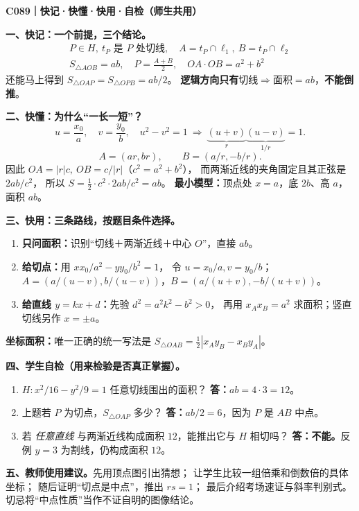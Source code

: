 \clearpage
\begin{summarybox}
\textbf{C089｜快记·快懂·快用·自检（师生共用）}

\textbf{一、快记：一个前提，三个结论。}
\[
\boxed{\begin{gathered}
P\in H,\ t_P\text{ 是 }P\text{ 处切线},\quad
A=t_P\cap\ell_1,\ B=t_P\cap\ell_2\\[2pt]
S_{\triangle AOB}=ab,\quad P=\frac{A+B}{2},\quad OA\cdot OB=a^2+b^2
\end{gathered}}
\]
还能马上得到 $S_{\triangle OAP}=S_{\triangle OPB}=ab/2$。
\textbf{逻辑方向只有}\quad$\text{切线}\Rightarrow\text{面积}=ab$，\textbf{不能倒推}。

\medskip
\textbf{二、快懂：为什么``一长一短''？}
\[
u=\frac{x_0}{a},\quad v=\frac{y_0}{b},\quad
u^2-v^2=1
\ \Rightarrow\ 
\underbrace{(u+v)}_{r}\underbrace{(u-v)}_{1/r}=1.
\]
\[
A=(ar,br),\qquad B=(a/r,-b/r).
\]
因此 $OA=|r|c,\ OB=c/|r|$（$c^2=a^2+b^2$），
而两渐近线的夹角固定且其正弦是 $2ab/c^2$，
所以 $S=\frac12\cdot c^2\cdot2ab/c^2=ab$。
\textbf{最小模型：}顶点处 $x=a$，底 $2b$、高 $a$，面积 $ab$。

\medskip
\textbf{三、快用：三条路线，按题目条件选择。}
\begin{enumerate}
\item \textbf{只问面积：}识别``切线＋两渐近线＋中心 $O$''，直接 $\boxed{ab}$。
\item \textbf{给切点：}用 $xx_0/a^2-yy_0/b^2=1$，
令 $u=x_0/a,v=y_0/b$；
$A=(a/(u-v),b/(u-v))$，$B=(a/(u+v),-b/(u+v))$。
\item \textbf{给直线 $y=kx+d$：}先验
$\boxed{d^2=a^2k^2-b^2>0}$，
再用 $x_Ax_B=a^2$ 求面积；竖直切线另作 $x=\pm a$。
\end{enumerate}
\textbf{坐标面积：}唯一正确的统一写法是
$\boxed{S_{\triangle OAB}=\frac12|x_Ay_B-x_By_A|}$。

\medskip
\textbf{四、学生自检（用来检验是否真正掌握）。}
\begin{enumerate}
\item $H:x^2/16-y^2/9=1$ 任意切线围出的面积？
\textbf{答：}$ab=4\cdot3=12$。
\item 上题若 $P$ 为切点，$S_{\triangle OAP}$ 多少？
\textbf{答：}$ab/2=6$，因为 $P$ 是 $AB$ 中点。
\item 若 \emph{任意直线} 与两渐近线构成面积 $12$，能推出它与 $H$ 相切吗？
\textbf{答：不能。}反例 $y=3$ 为割线，仍构成面积 $12$。
\end{enumerate}

\textbf{五、教师使用建议。}先用顶点图引出猜想；
让学生比较一组倍乘和倒数倍的具体坐标；
随后证明``切点是中点''，推出 $rs=1$；
最后介绍考场速证与斜率判别式。切忌将``中点性质''当作不证自明的图像结论。
\end{summarybox}
